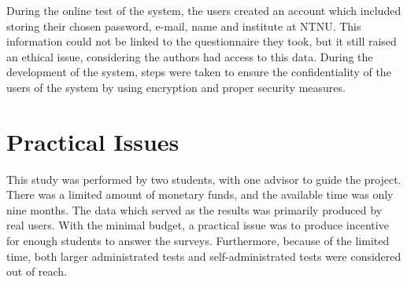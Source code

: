 During the online test of the system, the users created an account which included storing their chosen password, e-mail, name and institute at NTNU. This information could not be linked to the questionnaire they took, but it still raised an ethical issue, considering the authors had access to this data. During the development of the system, steps were taken to ensure the confidentiality of the users of the system by using encryption and proper security measures.


\section{Practical Issues}
This study was performed by two students, with one advisor to guide the project. There was a limited amount of monetary funds, and the available time was only nine months. The data which served as the results was primarily produced by real users. With the minimal budget, a practical issue was to produce incentive for enough students to answer the surveys. Furthermore, because of the limited time, both larger administrated tests and self-administrated tests were considered out of reach.

\cleardoublepage